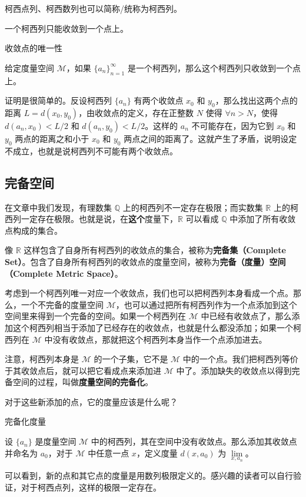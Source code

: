 柯西点列、柯西数列也可以简称/统称为柯西列。

一个柯西列只能收敛到一个点上。

\begin{theorem}{收敛点的唯一性}

给定度量空间 $\mathcal{M}$，如果 $\{a_n\}_{n=1}^{\infty}$ 是一个柯西列，那么这个柯西列只收敛到一个点上。

\end{theorem}

证明是很简单的。反设柯西列 $\{a_n\}$ 有两个收敛点 $x_0$ 和 $y_0$，那么找出这两个点的距离 $L=d(x_0, y_0)$，由收敛点的定义，存在正整数 $N$ 使得 $\forall n>N$，使得 $d(a_n, x_0)<L/2$ 和 $d(a_n, y_0)<L/2$。这样的 $a_n$ 不可能存在，因为它到 $x_0$ 和 $y_0$ 两点的距离之和小于 $x_0$ 和 $y_0$ 两点之间的距离了。这就产生了矛盾，说明设定不成立，也就是说柯西列不可能有两个收敛点。


\subsection{完备空间}

在文章中我们发现，有理数集 $\mathbb{Q}$ 上的柯西列不一定存在极限；而实数集 $\mathbb{R}$ 上的柯西列一定存在极限。也就是说，在\textbf{这个}度量下，$\mathbb{R}$ 可以看成 $\mathbb{Q}$ 中添加了所有收敛点构成的集合。

像 $\mathbb{R}$ 这样包含了自身所有柯西列的收敛点的集合，被称为\textbf{完备集（Complete Set）}。包含了自身所有柯西列的收敛点的度量空间，被称为\textbf{完备（度量）空间（Complete Metric Space）}。

考虑到一个柯西列唯一对应一个收敛点，我们也可以把柯西列本身看成一个点。那么，一个不完备的度量空间 $\mathcal{M}$，也可以通过把所有柯西列作为一个点添加到这个空间里来得到一个完备的空间。如果一个柯西列在 $\mathcal{M}$ 中已经有收敛点了，那么添加这个柯西列相当于添加了已经存在的收敛点，也就是什么都没添加；如果一个柯西列在 $\mathcal{M}$ 中没有收敛点，那就把这个柯西列本身当作一个点添加进去。

注意，柯西列本身是 $\mathcal{M}$ 的一个子集，它不是 $\mathcal{M}$ 中的一个点。我们把柯西列等价于其收敛点后，就可以把它看成点来添加进 $\mathcal{M}$ 中了。添加缺失的收敛点以得到完备空间的过程，叫做\textbf{度量空间的完备化}。

对于这些新添加的点，它的度量应该是什么呢？

\begin{definition}{完备化度量}

设 $\{a_n\}$ 是度量空间 $\mathcal{M}$ 中的柯西列，其在空间中没有收敛点。那么添加其收敛点并命名为 $a_0$，对于 $\mathcal{M}$ 中任意一点 $x$，定义度量 $d(x, a_0)$ 为 $\lim\limits_{x, a_n}$。

\end{definition}

可以看到，新的点和其它点的度量是用数列极限定义的。感兴趣的读者可以自行验证，对于柯西点列，这样的极限一定存在。

